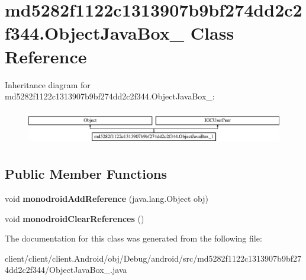 \hypertarget{classmd5282f1122c1313907b9bf274dd2c2f344_1_1ObjectJavaBox__1}{}\section{md5282f1122c1313907b9bf274dd2c2f344.\+Object\+Java\+Box\+\_ Class Reference}
\label{classmd5282f1122c1313907b9bf274dd2c2f344_1_1ObjectJavaBox__1}
Inheritance diagram for md5282f1122c1313907b9bf274dd2c2f344.\+Object\+Java\+Box\+\_\+:\begin{figure}[H]
\begin{center}
\leavevmode
\includegraphics[height=1.546961cm]{classmd5282f1122c1313907b9bf274dd2c2f344_1_1ObjectJavaBox__1}
\end{center}
\end{figure}
\subsection*{Public Member Functions}
\begin{DoxyCompactItemize}
\item 
\hypertarget{classmd5282f1122c1313907b9bf274dd2c2f344_1_1ObjectJavaBox__1_a896a6f3ba71cffc84181d104eef6f94d}{}void {\bfseries monodroid\+Add\+Reference} (java.\+lang.\+Object obj)\label{classmd5282f1122c1313907b9bf274dd2c2f344_1_1ObjectJavaBox__1_a896a6f3ba71cffc84181d104eef6f94d}

\item 
\hypertarget{classmd5282f1122c1313907b9bf274dd2c2f344_1_1ObjectJavaBox__1_a556f32ad648c9c246b1d9b4588152913}{}void {\bfseries monodroid\+Clear\+References} ()\label{classmd5282f1122c1313907b9bf274dd2c2f344_1_1ObjectJavaBox__1_a556f32ad648c9c246b1d9b4588152913}

\end{DoxyCompactItemize}


The documentation for this class was generated from the following file\+:\begin{DoxyCompactItemize}
\item 
client/client/client.\+Android/obj/\+Debug/android/src/md5282f1122c1313907b9bf274dd2c2f344/Object\+Java\+Box\+\_.\+java\end{DoxyCompactItemize}
